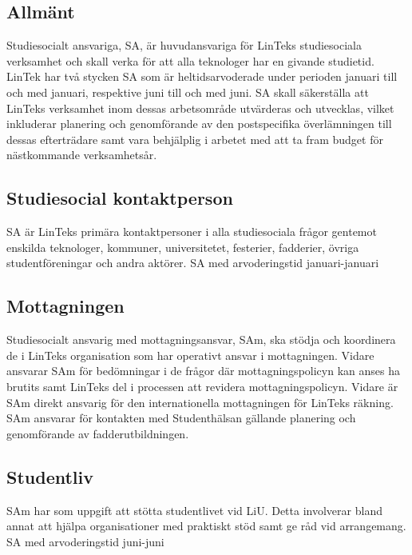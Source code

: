\hypertarget{allmuxe4nt-2}{%
\subsection{Allmänt}\label{allmuxe4nt-2}}

Studiesocialt ansvariga, SA, är huvudansvariga för LinTeks studiesociala
verksamhet och skall verka för att alla teknologer har en givande
studietid. LinTek har två stycken SA som är heltidsarvoderade under
perioden januari till och med januari, respektive juni till och med
juni. SA skall säkerställa att LinTeks verksamhet inom dessas
arbetsområde utvärderas och utvecklas, vilket inkluderar planering och
genomförande av den postspecifika överlämningen till dessas efterträdare
samt vara behjälplig i arbetet med att ta fram budget för nästkommande
verksamhetsår.

\hypertarget{studiesocial-kontaktperson}{%
\subsection{Studiesocial
kontaktperson}\label{studiesocial-kontaktperson}}

SA är LinTeks primära kontaktpersoner i alla studiesociala frågor
gentemot enskilda teknologer, kommuner, universitetet, festerier,
fadderier, övriga studentföreningar och andra aktörer. SA med
arvoderingstid januari-januari

\hypertarget{mottagningen}{%
\subsection{Mottagningen}\label{mottagningen}}

Studiesocialt ansvarig med mottagningsansvar, SAm, ska stödja och
koordinera de i LinTeks organisation som har operativt ansvar i
mottagningen. Vidare ansvarar SAm för bedömningar i de frågor där
mottagningspolicyn kan anses ha brutits samt LinTeks del i processen att
revidera mottagningspolicyn. Vidare är SAm direkt ansvarig för den
internationella mottagningen för LinTeks räkning. SAm ansvarar för
kontakten med Studenthälsan gällande planering och genomförande av
fadderutbildningen.

\hypertarget{studentliv}{%
\subsection{Studentliv}\label{studentliv}}

SAm har som uppgift att stötta studentlivet vid LiU. Detta involverar
bland annat att hjälpa organisationer med praktiskt stöd samt ge råd vid
arrangemang. SA med arvoderingstid juni-juni

